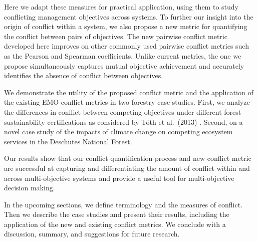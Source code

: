 Here we adapt these measures for practical application, using them to study conflicting management objectives across systems. To further our insight into the origin of conflict within a system, we also propose a new metric for quantifying the conflict between pairs of objectives. The new pairwise conflict metric developed here improves on other commonly used pairwise conflict metrics such as the Pearson and Spearman coefficients. Unlike current metrics, the one we propose simultaneously captures mutual objective achievement and accurately identifies the absence of conflict between objectives.

We demonstrate the utility of the proposed conflict metric and the application of the existing EMO conflict metrics in two forestry case studies. First, we analyze the differences in conflict between competing objectives under different forest sustainability certifications as considered by T{\'o}th et al.\ (2013) \cite{toth2013ecosel}. Second, on a novel case study of the impacts of climate change on competing ecosystem services in the Deschutes National Forest.

Our results show that our conflict quantification process and new conflict metric are successful at capturing and differentiating the amount of conflict within and across multi-objective systems and provide a useful tool for multi-objective decision making.

In the upcoming sections, we define terminology and the measures of conflict. Then we describe the case studies and present their results, including the application of the new and existing conflict metrics. We conclude with a discussion, summary, and suggestions for future research.